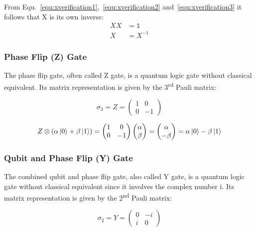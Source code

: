 From Equ.~\ref{equ:xverification1},~\ref{equ:xverification2} and~\ref{equ:xverification3} it follows that X is its own inverse:
\begin{align}
XX &= \mathbb{1} \\
X &= X^{-1}
\end{align}

\subsubsection{Phase Flip (Z) Gate}
\label{subsubsubsec:zgate}

The phase flip gate, often called Z gate, is a quantum logic gate without classical equivalent. Its matrix representation is given by the 3\textsuperscript{rd} Pauli matrix:

\begin{equation}
\sigma_{3} = Z = \begin{pmatrix}
 1 & 0 \\ 
 0 & -1
 \end{pmatrix}
\end{equation}



\begin{equation}
\label{equ:yverification}
Z \otimes (\alpha \ket{0} + \beta \ket{1}) = \begin{pmatrix}
 1 & 0 \\ 
 0 & -1
 \end{pmatrix} \begin{pmatrix}
 \alpha  \\ 
 \beta
 \end{pmatrix} = \begin{pmatrix}
 \alpha  \\ 
 -\beta
 \end{pmatrix} = \alpha \ket{0} - \beta \ket{1}
\end{equation}

\subsubsection{Qubit and Phase Flip (Y) Gate}
\label{subsubsubsec:ygate}

The combined qubit and phase flip gate, also called Y gate, is a quantum logic gate without classical equivalent since it involves the complex number i. Its matrix representation is given by the 2\textsuperscript{nd} Pauli matrix:

\begin{equation}
\sigma_{2} = Y = \begin{pmatrix}
 0 & -i \\ 
 i & 0
 \end{pmatrix}
\end{equation}

